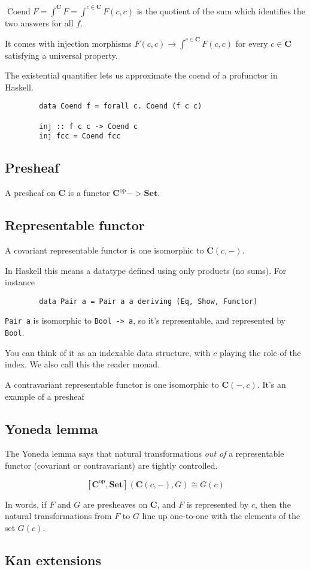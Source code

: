 \documentclass[11pt]{amsart}
\DeclareMathOperator{\Coend}{Coend}
\newcommand{\cat}[1]{\mathbf{#1}}
\newcommand{\op}[1]{#1^{\text{op}}}
\newcommand{\blank}{{-}}
\begin{document}
    $\Coend F = \int^{\cat C} F = \int^{c\in\cat C} F(c,c)$
    is the quotient of the sum which identifies the two answers for all $f$.

    It comes with injection morphisms
    $F(c, c) \to \int^{c\in\cat C} F(c,c)$ for every $c\in \cat{C}$
    satisfying a universal property.

    The existential quantifier lets us approximate the coend of a profunctor in Haskell.

    \begin{verbatim}
        data Coend f = forall c. Coend (f c c)

        inj :: f c c -> Coend c
        inj fcc = Coend fcc
    \end{verbatim}

    \subsection*{Presheaf}
    A presheaf on $\cat C$ is a functor $\op{\cat C} -> \cat{Set}$.

    \subsection*{Representable functor}
    A covariant representable functor is one isomorphic to $\cat{C}(c, \blank)$.

    In Haskell this means a datatype defined using only products (no sums).
    For instance

    \begin{verbatim}
        data Pair a = Pair a a deriving (Eq, Show, Functor)
    \end{verbatim}

    \verb|Pair a| is isomorphic to \verb|Bool -> a|, so it's representable, and represented by \verb|Bool|.

    You can think of it as an indexable data structure, with $c$ playing the role of the index.
    We also call this the reader monad.

    A contravariant representable functor is one isomorphic to $\cat{C}(\blank, c)$.
    It's an example of a presheaf

    \subsection*{Yoneda lemma}
    The Yoneda lemma says that natural transformations \textit{out of} a representable functor (covariant or
    contravariant)
    are tightly controlled.

    \[
        [\op{\cat{C}}, \cat{Set}]\left(\cat{C}(c, \blank), G\right) \cong G(c)
    \]

    In words, if $F$ and $G$ are presheaves on $\cat C$, and $F$ is represented by $c$, then the natural transformations
    from $F$ to $G$ line up one-to-one with the elements of the set $G(c)$.
    \subsection*{Kan extensions}
    \subsection*{}
\end{document}
